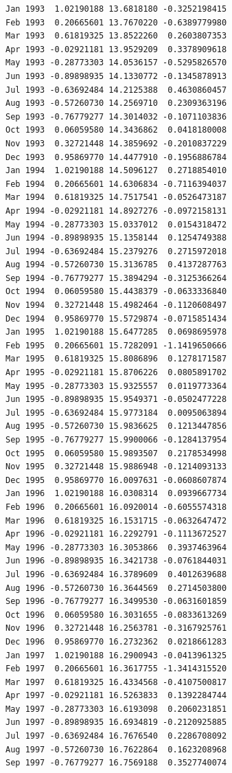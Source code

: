 \documentclass[
  11pt,
  a4paper,
]{report}
\begin{document}
\begin{verbatim}
Jan 1993  1.02190188 13.6818180 -0.3252198415
Feb 1993  0.20665601 13.7670220 -0.6389779980
Mar 1993  0.61819325 13.8522260  0.2603807353
Apr 1993 -0.02921181 13.9529209  0.3378909618
May 1993 -0.28773303 14.0536157 -0.5295826570
Jun 1993 -0.89898935 14.1330772 -0.1345878913
Jul 1993 -0.63692484 14.2125388  0.4630860457
Aug 1993 -0.57260730 14.2569710  0.2309363196
Sep 1993 -0.76779277 14.3014032 -0.1071103836
Oct 1993  0.06059580 14.3436862  0.0418180008
Nov 1993  0.32721448 14.3859692 -0.2010837229
Dec 1993  0.95869770 14.4477910 -0.1956886784
Jan 1994  1.02190188 14.5096127  0.2718854010
Feb 1994  0.20665601 14.6306834 -0.7116394037
Mar 1994  0.61819325 14.7517541 -0.0526473187
Apr 1994 -0.02921181 14.8927276 -0.0972158131
May 1994 -0.28773303 15.0337012  0.0154318472
Jun 1994 -0.89898935 15.1358144  0.1254749388
Jul 1994 -0.63692484 15.2379276  0.2715972018
Aug 1994 -0.57260730 15.3136785  0.4137287763
Sep 1994 -0.76779277 15.3894294 -0.3125366264
Oct 1994  0.06059580 15.4438379 -0.0633336840
Nov 1994  0.32721448 15.4982464 -0.1120608497
Dec 1994  0.95869770 15.5729874 -0.0715851434
Jan 1995  1.02190188 15.6477285  0.0698695978
Feb 1995  0.20665601 15.7282091 -1.1419650666
Mar 1995  0.61819325 15.8086896  0.1278171587
Apr 1995 -0.02921181 15.8706226  0.0805891702
May 1995 -0.28773303 15.9325557  0.0119773364
Jun 1995 -0.89898935 15.9549371 -0.0502477228
Jul 1995 -0.63692484 15.9773184  0.0095063894
Aug 1995 -0.57260730 15.9836625  0.1213447856
Sep 1995 -0.76779277 15.9900066 -0.1284137954
Oct 1995  0.06059580 15.9893507  0.2178534998
Nov 1995  0.32721448 15.9886948 -0.1214093133
Dec 1995  0.95869770 16.0097631 -0.0608607874
Jan 1996  1.02190188 16.0308314  0.0939667734
Feb 1996  0.20665601 16.0920014 -0.6055574318
Mar 1996  0.61819325 16.1531715 -0.0632647472
Apr 1996 -0.02921181 16.2292791 -0.1113672527
May 1996 -0.28773303 16.3053866  0.3937463964
Jun 1996 -0.89898935 16.3421738 -0.0761844031
Jul 1996 -0.63692484 16.3789609  0.4012639688
Aug 1996 -0.57260730 16.3644569  0.2714503800
Sep 1996 -0.76779277 16.3499530 -0.0631601859
Oct 1996  0.06059580 16.3031655 -0.0833613269
Nov 1996  0.32721448 16.2563781 -0.3167925761
Dec 1996  0.95869770 16.2732362  0.0218661283
Jan 1997  1.02190188 16.2900943 -0.0413961325
Feb 1997  0.20665601 16.3617755 -1.3414315520
Mar 1997  0.61819325 16.4334568 -0.4107500817
Apr 1997 -0.02921181 16.5263833  0.1392284744
May 1997 -0.28773303 16.6193098  0.2060231851
Jun 1997 -0.89898935 16.6934819 -0.2120925885
Jul 1997 -0.63692484 16.7676540  0.2286708092
Aug 1997 -0.57260730 16.7622864  0.1623208968
Sep 1997 -0.76779277 16.7569188  0.3527740074

\end{verbatim}
\end{document}
